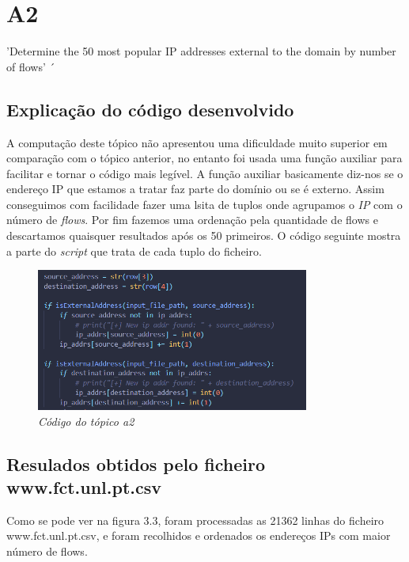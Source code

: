 \chapter{A2}

{\LARGE 'Determine the 50 most popular IP addresses external to the domain by number of flows'}
´
\section{Explicação do código desenvolvido}

A computação deste tópico não apresentou uma dificuldade muito superior em comparação com o tópico anterior, no entanto foi usada uma função auxiliar para facilitar e tornar o código mais legível. A função auxiliar basicamente diz-nos se o endereço IP que estamos a tratar faz parte do domínio ou se é externo. Assim conseguimos com facilidade fazer uma lsita de tuplos onde agrupamos o \textit{IP} com o número de \textit{flows}. Por fim fazemos uma ordenação pela quantidade de flows e descartamos quaisquer resultados após os 50 primeiros. O código seguinte mostra a parte do \textit{script} que trata de cada tuplo do ficheiro.


\begin{figure}[h!]
    \label{high}
    \centering
    \includegraphics[width=0.8\textwidth]{Images/a2/a2.png}
    \caption{\textit{Código do tópico a2}}
\end{figure}


\newpage

\section{Resulados obtidos pelo ficheiro www.fct.unl.pt.csv}

Como  se  pode  ver  na  figura  3.3,  foram  processadas  as  21362  linhas  do ficheiro www.fct.unl.pt.csv, e foram recolhidos e ordenados os endereços IPs com maior número de flows.

